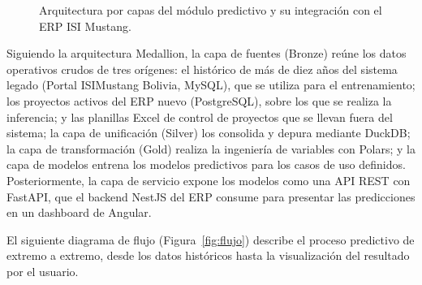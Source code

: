 \documentclass{univalle-perfil}
\begin{document}
\begin{figure}[H]
{
}
\caption{Arquitectura por capas del módulo predictivo y su integración con el ERP ISI Mustang.}
\label{fig:arquitectura}
\end{figure}

Siguiendo la arquitectura Medallion, la capa de fuentes (Bronze) reúne los datos operativos crudos de tres orígenes: el histórico de más de diez años del sistema legado (Portal ISIMustang Bolivia, MySQL), que se utiliza para el entrenamiento; los proyectos activos del ERP nuevo (PostgreSQL), sobre los que se realiza la inferencia; y las planillas Excel de control de proyectos que se llevan fuera del sistema; la capa de unificación (Silver) los consolida y depura mediante DuckDB; la capa de transformación (Gold) realiza la ingeniería de variables con Polars; y la capa de modelos entrena los modelos predictivos para los casos de uso definidos. Posteriormente, la capa de servicio expone los modelos como una API REST con FastAPI, que el backend NestJS del ERP consume para presentar las predicciones en un dashboard de Angular.

El siguiente diagrama de flujo (Figura~\ref{fig:flujo}) describe el proceso predictivo de extremo a extremo, desde los datos históricos hasta la visualización del resultado por el usuario.
\end{document}
